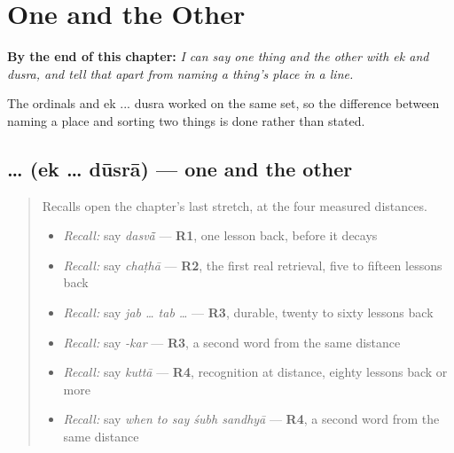 
\chapter{One and the Other}
\label{ch:hi-one-and-the-other}

\begin{chapteropening}
\textbf{By the end of this chapter:} \emph{I can say one thing and the other with ek and dusra, and tell that apart from naming a thing's place in a line.}

The ordinals and ek ... dusra worked on the same set, so the difference between naming a place and sorting two things is done rather than stated.
\end{chapteropening}

\section[\texorpdfstring{\hi{एक} … \hi{दूसरा} (ek … dūsrā)}{एक … दूसरा (ek … dūsrā)}]{ …  (ek … dūsrā) — one and the other}

\label{lesson:HI-C77-one-other}



\begin{quote}
Recalls open the chapter's last stretch, at the four measured distances.

\begin{itemize}
\raggedright
  \item \emph{Recall:} say \emph{dasvā̃} — \textbf{R1}, one lesson back, before it decays
  \item \emph{Recall:} say \emph{chaṭhā} — \textbf{R2}, the first real retrieval, five to fifteen lessons back
  \item \emph{Recall:} say \emph{jab … tab …} — \textbf{R3}, durable, twenty to sixty lessons back
  \item \emph{Recall:} say \emph{-kar} — \textbf{R3}, a second word from the same distance
  \item \emph{Recall:} say \emph{kuttā} — \textbf{R4}, recognition at distance, eighty lessons back or more
  \item \emph{Recall:} say \emph{when to say śubh sandhyā} — \textbf{R4}, a second word from the same distance
\end{itemize}
\end{quote}

